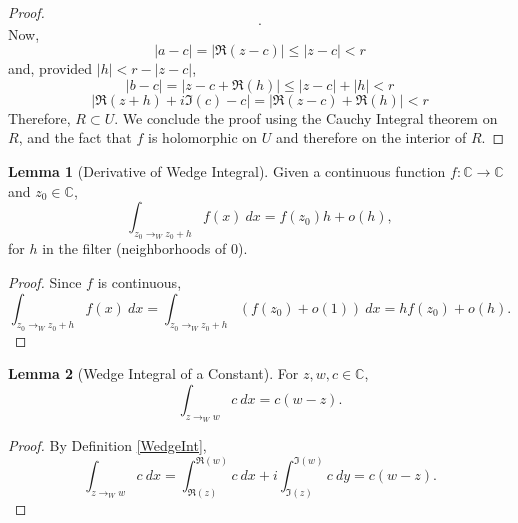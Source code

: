 \documentclass{report}
\theoremstyle{definition}
\newtheorem{lemma}{Lemma}
\begin{document}
\begin{proof}
\begin{equation}
    .
  \end{equation}
  Now,
  \begin{equation}
    |a-c|=|\Re(z-c)|\le |z-c|< r
  \end{equation}
  and, provided $|h|<r-|z-c|$,
  \begin{equation}
    |b-c|=|z-c+\Re(h)|\le |z-c|+|h|< r
  \end{equation}
  \begin{equation}
    |\Re(z+h)+i\Im(c)-c|=|\Re(z-c)+\Re(h)|< r
  \end{equation}
  Therefore, $R\subset U$.
  We conclude the proof using the Cauchy Integral theorem on $R$, and the fact that $f$ is holomorphic on $U$ and therefore on the interior of $R$.
\end{proof}

\begin{lemma}[Derivative of Wedge Integral]
  \label{deriv_of_wedgeInt}
  \leanok
  Given a continuous function $f:\mathbb C\to\mathbb C$ and $z_0\in\mathbb C$,
  \begin{equation}
    \int_{z_0\to_W z_0+h}f(x)\ dx = f(z_0)h + o(h)
    ,
  \end{equation}
  for $h$ in the filter (neighborhoods of $0$).
\end{lemma}

\begin{proof}
  Since $f$ is continuous,
  \begin{equation}
    \int_{z_0\to_W z_0+h}f(x)\ dx
    =
    \int_{z_0\to_W z_0+h}(f(z_0)+o(1))\ dx
    =
    hf(z_0)+o(h)
    .
  \end{equation}
\end{proof}

\begin{lemma}[Wedge Integral of a Constant]
  \label{wedgeInt_of_const}
  \leanok
  For $z,w,c\in\mathbb C$,
  \begin{equation}
    \int_{z\to_W w} c\ dx
    =
    c(w-z)
    .
  \end{equation}
\end{lemma}

\begin{proof}\leanok
  By Definition \ref{WedgeInt},
  \begin{equation}
    \int_{z\to_W w} c\ dx
    =
    \int_{\Re(z)}^{\Re(w)} c\ dx
    +
    i\int_{\Im(z)}^{\Im(w)} c\ dy
    =c(w-z)
    .
  \end{equation}
\end{proof}
\end{document}
